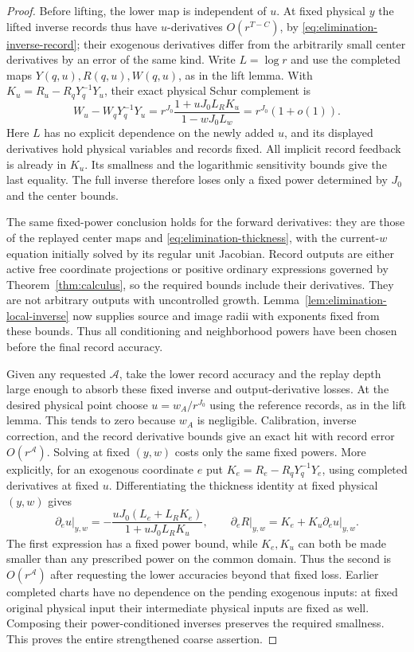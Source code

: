\begin{proof}
Before lifting, the lower map is independent of $u$.  At fixed
physical $y$ the lifted inverse records thus have $u$-derivatives
$O(r^{T-C})$, by \eqref{eq:elimination-inverse-record}; their
exogenous derivatives differ from the arbitrarily small center
derivatives by an error of the same kind.  Write $L=\log r$ and
use the completed maps $Y(q,u),R(q,u),W(q,u)$, as in the lift lemma.
With $K_u=R_u-R_qY_q^{-1}Y_u$, their exact physical Schur complement is
\begin{equation}\label{eq:elimination-thickness-schur}
 W_u-W_qY_q^{-1}Y_u
 =r^{J_0}\frac{1+uJ_0L_RK_u}{1-wJ_0L_w}
 =r^{J_0}(1+o(1)).
\end{equation}
Here $L$ has no explicit dependence on the newly added $u$, and its
displayed derivatives hold physical variables and records fixed.
All implicit record feedback is already in $K_u$.  Its smallness and
the logarithmic sensitivity bounds give the last equality.  The full
inverse therefore loses only a fixed power determined by $J_0$ and
the center bounds.

The same fixed-power conclusion holds for the forward derivatives:
they are those of the replayed center maps and
\eqref{eq:elimination-thickness}, with the current-$w$ equation
initially solved by its regular unit Jacobian.  Record outputs are
either active free coordinate projections or positive ordinary
expressions governed by Theorem~\ref{thm:calculus}, so the required
bounds include their derivatives.  They are not arbitrary outputs
with uncontrolled growth.  Lemma~\ref{lem:elimination-local-inverse}
now supplies source and image radii with exponents fixed from these
bounds.  Thus all conditioning and neighborhood powers have been
chosen before the final record accuracy.

Given any requested $\mathcal A$, take the lower record accuracy and the replay
depth large enough to absorb these fixed inverse and output-derivative
losses.  At the desired physical point choose
$u=w_A/r^{J_0}$ using the reference records, as in the lift lemma.
This tends to zero because $w_A$ is negligible.  Calibration,
inverse correction, and the record derivative bounds give an exact
hit with record error $O(r^{\mathcal A})$.  Solving at fixed $(y,w)$ costs only
the same fixed powers.  More explicitly, for an exogenous coordinate
$e$ put $K_e=R_e-R_qY_q^{-1}Y_e$, using completed derivatives
at fixed $u$.  Differentiating the thickness identity at fixed
physical $(y,w)$ gives
\[
 \left.\partial_eu\right|_{y,w}
 =-\frac{uJ_0(L_e+L_RK_e)}{1+uJ_0L_RK_u},\qquad
 \left.\partial_eR\right|_{y,w}
 =K_e+K_u\left.\partial_eu\right|_{y,w}.
\]
The first expression has a fixed power bound, while $K_e,K_u$
can both be made smaller than any prescribed power on the common
domain.  Thus the second is $O(r^{\mathcal A})$ after requesting the lower
accuracies beyond that fixed loss.  Earlier completed charts have
no dependence on the
pending exogenous inputs: at fixed original physical input their
intermediate physical inputs are fixed as well.  Composing their
power-conditioned inverses preserves the required smallness.  This
proves the entire strengthened coarse assertion.


\end{proof}

